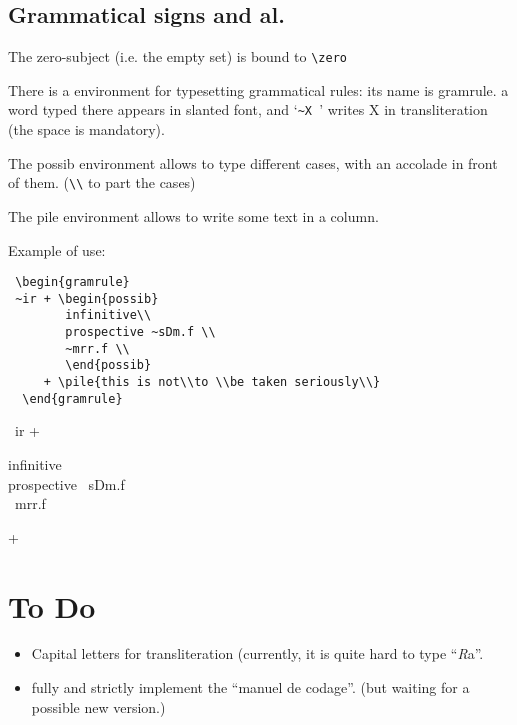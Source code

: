 \documentclass[final]{article}
\def\htimage#1{{#1\relax}}
\begin{document}
\subsection{Grammatical signs and al.}

 The zero-subject (i.e. the empty set) is bound to \verb/\zero/

 There is a environment for typesetting grammatical rules:
 its name is gramrule.
 a word typed there appears in slanted font, and `\verb*/~X /' 
 writes X in transliteration (the space is mandatory).
 
 The possib environment allows to type different cases, with 
 an accolade in front of them. (\verb/\\/ to part the cases)
 
 The pile environment allows to write some text in a column.
 
 Example of use:
        
\begin{verbatim}
 \begin{gramrule} 
 ~ir + \begin{possib}
        infinitive\\
        prospective ~sDm.f \\
        ~mrr.f \\
        \end{possib} 
     + \pile{this is not\\to \\be taken seriously\\}
  \end{gramrule}
\end{verbatim}
 \begin{gramrule} 
 ~ir + \begin{possib}
        infinitive\\
        prospective ~sDm.f \\
        ~mrr.f \\
        \end{possib} 
     + 
  \end{gramrule}

\section{To Do}
\begin{itemize}
\item Capital letters for transliteration (currently, it is quite
  hard to type ``{\it R}\htimage{\eg a\/}''.
\item fully and strictly implement the ``manuel de codage''. (but
  waiting for a possible new version.)
\end{itemize}
\end{document}
